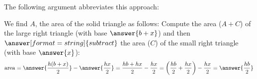 \documentclass[nooutcomes,space,handout]{ximera}
\begin{document}
\begin{problem}
\begin{problem}
\end{problem}

\begin{problem}
The following argument abbreviates this approach:
\begin{image}
\end{image}

We find $A$, the area of the solid triangle as follows: Compute the area ($A+C$) of the large right triangle (with base $\answer{b+x}$) and then 
$\answer[format=string]{subtract}$ the area ($C$) of the small right triangle (with base $\answer{x}$): 
\[
\mathrm{area} =  \answer{\frac{h(b+x)}{2}} - \answer{\frac{hx}{2}}= \frac{hb+hx}{2} - \frac{hx}{2}
= \left(\frac{hb}{2} + \frac{hx}{2}\right) - \frac{hx}{2} = \answer{\frac{hb}{2}}
\]
\end{problem}
\end{problem}
\end{document}
